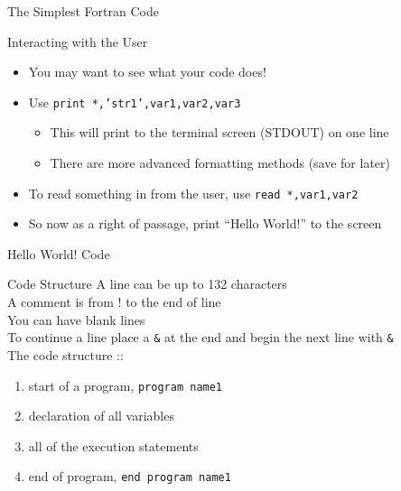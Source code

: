 \documentclass{beamer}
\begin{document}
\begin{frame}{The Simplest Fortran Code}
\vfill
  
\vfill
\end{frame}
\begin{frame}{Interacting with the User}
\begin{itemize}
  \item You may want to see what your code does!
  \vfill\item Use \texttt{print *,'str1',var1,var2,var3}
    \begin{itemize}
      \item This will print to the terminal screen (STDOUT) on one line 
      \item There are more advanced formatting methods (save for later)
    \end{itemize}
  \vfill\item To read something in from the user, use \texttt{read *,var1,var2}
  \vfill\item So now as a right of passage, print ``Hello World!'' to the screen
\end{itemize}
\end{frame}
\begin{frame}{Hello World! Code}
\vfill
  
\vfill
\end{frame}
\begin{frame}{Code Structure}
A line can be up to 132 characters \\
A comment is from \alert{!} to the end of line  \\
You can have blank lines  \\
To continue a line place a \texttt{\&} at the end and begin the next line with \texttt{\&} \\
\vfill
The code structure ::
\begin{enumerate}
  \item start of a program, \texttt{program name1}
  \vfill\item declaration of all variables
  \vfill\item all of the execution statements
  \vfill\item end of program, \texttt{end program name1}
\end{enumerate}

\end{frame}
\end{document}
